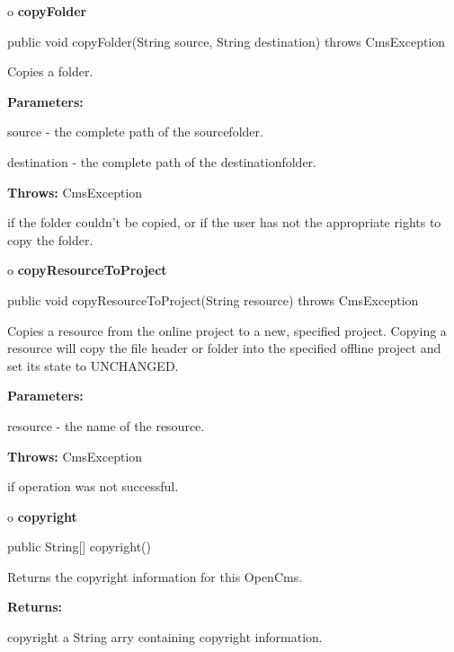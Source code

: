 o {\bf copyFolder} 

\begin{PRE}
 public void copyFolder(String source,
                        String destination) throws CmsException
\end{PRE}

\begin{description}
\htmlDD Copies a folder. 

\begin{description}
\item {\bf Parameters:}  

source - the complete path of the sourcefolder.  

destination - the complete path of the destinationfolder.  
\item {\bf Throws:} CmsException  

if the folder couldn't be copied, or if the user has not the appropriate
rights to copy the folder.  
\end{description}

\end{description}

o {\bf copyResourceToProject} 

\begin{PRE}
 public void copyResourceToProject(String resource) throws CmsException
\end{PRE}

\begin{description}
\htmlDD Copies a resource from the online project to a new, specified project.
\htmlBR
Copying a resource will copy the file header or folder into the specified
offline project and set its state to UNCHANGED. 

\begin{description}
\item {\bf Parameters:}  

resource - the name of the resource.  
\item {\bf Throws:} CmsException  

if operation was not successful.  
\end{description}

\end{description}

o {\bf copyright} 

\begin{PRE}
 public String[] copyright()
\end{PRE}

\begin{description}
\htmlDD Returns the copyright information for this OpenCms. 

\begin{description}
\item {\bf Returns:}  

copyright a String arry containing copyright information.  
\end{description}

\end{description}

